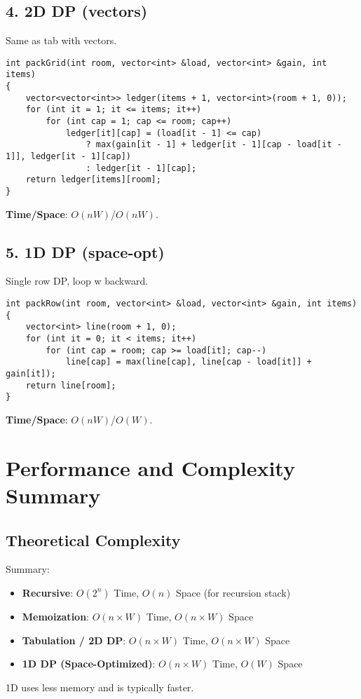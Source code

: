 \documentclass[12pt]{article}
\begin{document}
\subsection*{4. 2D DP (vectors)}
Same as tab with vectors.
\begin{lstlisting}
int packGrid(int room, vector<int> &load, vector<int> &gain, int items)
{
    vector<vector<int>> ledger(items + 1, vector<int>(room + 1, 0));
    for (int it = 1; it <= items; it++)
        for (int cap = 1; cap <= room; cap++)
            ledger[it][cap] = (load[it - 1] <= cap)
                ? max(gain[it - 1] + ledger[it - 1][cap - load[it - 1]], ledger[it - 1][cap])
                : ledger[it - 1][cap];
    return ledger[items][room];
}
\end{lstlisting}
\textbf{Time/Space}: $O(nW)$/$O(nW)$.

\subsection*{5. 1D DP (space-opt)}
Single row DP, loop w backward.
\begin{lstlisting}
int packRow(int room, vector<int> &load, vector<int> &gain, int items)
{
    vector<int> line(room + 1, 0);
    for (int it = 0; it < items; it++)
        for (int cap = room; cap >= load[it]; cap--)
            line[cap] = max(line[cap], line[cap - load[it]] + gain[it]);
    return line[room];
}
\end{lstlisting}
\textbf{Time/Space}: $O(nW)$/$O(W)$.

\newpage
\section{Performance and Complexity Summary}

\subsection*{Theoretical Complexity}
Summary:
\begin{itemize}
    \item \textbf{Recursive}: $O(2^n)$ Time, $O(n)$ Space (for recursion stack)
    \item \textbf{Memoization}: $O(n \times W)$ Time, $O(n \times W)$ Space
    \item \textbf{Tabulation / 2D DP}: $O(n \times W)$ Time, $O(n \times W)$ Space
    \item \textbf{1D DP (Space-Optimized)}: $O(n \times W)$ Time, $O(W)$ Space
\end{itemize}
1D uses less memory and is typically faster.
\end{document}
